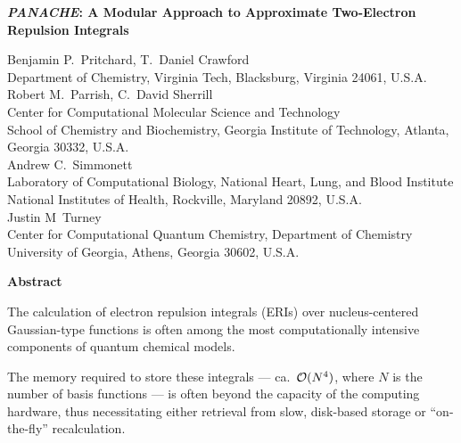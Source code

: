 \documentclass[12pt,letterpaper]{article}
\newcommand{\panache}{\textit{PANACHE}\xspace}
\begin{document}
\begin{center}
\large\textbf{\panache: A Modular Approach to Approximate Two-Electron Repulsion Integrals}
%
\vspace*{2ex}

\normalfont
\normalsize
%
Benjamin P.\ Pritchard, T.\ Daniel Crawford\\
{Department of Chemistry, Virginia Tech, Blacksburg, Virginia 24061, U.S.A.}\\
\vspace{2ex}
Robert M.\ Parrish, C.\ David Sherrill\\
{Center for Computational Molecular Science and Technology \\
School of Chemistry and Biochemistry, Georgia Institute of Technology, Atlanta, Georgia 30332, U.S.A.}\\
\vspace{2ex}
Andrew C.\ Simmonett \\
{Laboratory of Computational Biology, National Heart, Lung, and Blood Institute\\
National Institutes of Health, Rockville, Maryland 20892, U.S.A.}\\
\vspace{2ex}
Justin M\ Turney\\
{Center for Computational Quantum Chemistry, Department of Chemistry \\
University of Georgia, Athens, Georgia 30602, U.S.A.} \\

\date{\today}
\end{center}


\doublespacing


\begin{center}
\textbf{Abstract}
\end{center}

The calculation of electron repulsion integrals (ERIs) over nucleus-centered
Gaussian-type functions is often among the most computationally
intensive components of quantum chemical models.

The memory required to store these integrals --- ca.\ ${\cal O}(N^4)$,
where $N$ is the number of basis functions --- is often beyond the capacity of
the computing hardware, thus necessitating either retrieval from slow,
disk-based storage or ``on-the-fly'' recalculation.
\end{document}

